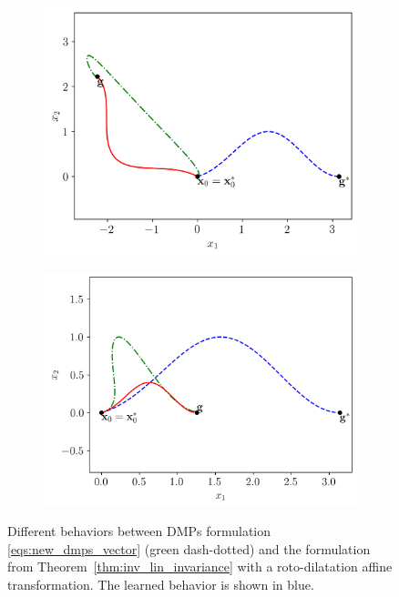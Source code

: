 \documentclass[fleqn, 11pt]{article}
\theoremstyle{definition}
\theoremstyle{plain}
\theoremstyle{remark}
\begin{document}
\begin{figure}
    \begin{subfigure}{0.45\linewidth}
       \centering
       \includegraphics[width=\textwidth]{imgs/exp_alpha_rot_slides.png}
    \end{subfigure}
    \hfill
    \begin{subfigure}{0.45\linewidth}
       \centering
       \includegraphics[width=\textwidth]{imgs/exp_alpha_shrink_slides.png}
    \end{subfigure}
    \caption{Different behaviors between DMPs formulation \eqref{eqs:new_dmps_vector} (green dash-dotted) and  the formulation from Theorem~\ref{thm:inv_lin_invariance} with a roto-dilatation affine transformation.
    The learned behavior is shown in blue.}
    \label{fig:dmp_pp_exp}
\end{figure}
\end{document}
